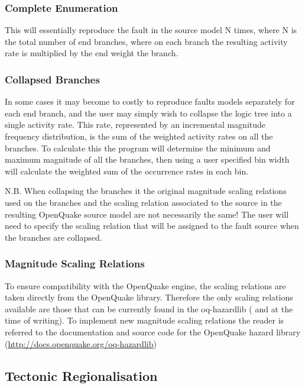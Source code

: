 \subsubsection{Complete Enumeration}

This will essentially reproduce the fault in the source model N times, where N is the total number of end branches, where on each branch the resulting activity rate is multiplied by the end weight the branch.

\subsubsection{Collapsed Branches}

In some cases it may become to costly to reproduce faults models separately for each end branch, and the user may simply wish to collapse the logic tree into a single activity rate. This rate, represented by an incremental magnitude frequency distribution, is the sum of the weighted activity rates on all the branches. To calculate this the program will determine the minimum and maximum magnitude of all the branches, then using a user specified bin width will calculate the weighted sum of the occurrence rates in each bin. 

N.B. When collapsing the branches it the original magnitude scaling relations used on the branches and the scaling relation associated to the source in the resulting OpenQuake source model are not necessarily the same! The user will need to specify the scaling relation that will be assigned to the fault source when the branches are collapsed. 

\subsubsection{Magnitude Scaling Relations}

To ensure compatibility with the OpenQuake engine, the scaling relations are taken directly from the OpenQuake library. Therefore the only scaling relations available are those that can be currently found in the oq-hazardlib (\citet{wells1994} and \citet{thomas2010} at the time of writing). To implement new magnitude scaling relations the reader is referred to the documentation and source code for the OpenQuake hazard library (\href{http://docs.openquake.org/oq-hazardlib}{http://docs.openquake.org/oq-hazardlib})

\subsection{Tectonic Regionalisation}

